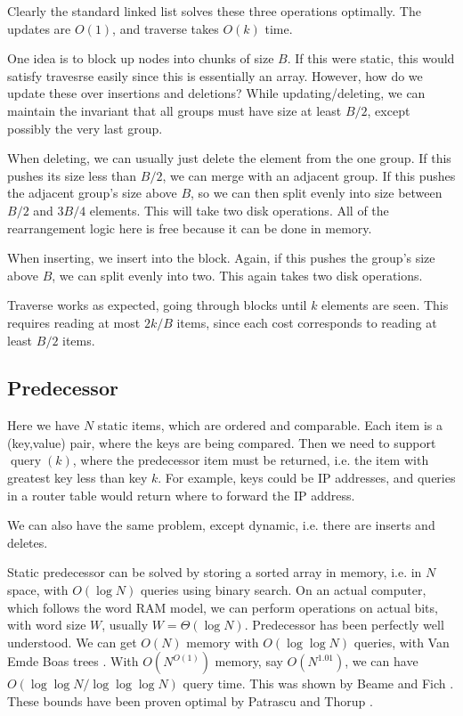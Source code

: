 \documentclass[11pt]{article}
\newcommand{\on}{\operatorname}
\begin{document}
Clearly the standard linked list solves these three operations optimally. The updates are $O(1)$, and traverse takes $O(k)$ time.

One idea is to block up nodes into chunks of size $B$. If this were static, this would satisfy travesrse easily since this is essentially an array. However, how do we update these over insertions and deletions? While updating/deleting, we can maintain the invariant that all groups must have size at least $B / 2$, except possibly the very last group.

When deleting, we can usually just delete the element from the one group. If this pushes its size less than $B / 2$, we can merge with an adjacent group. If this pushes the adjacent group's size above $B$, so we can then split evenly into size between $B / 2$ and $3B / 4$ elements. This will take two disk operations. All of the rearrangement logic here is free because it can be done in memory.

When inserting, we insert into the block. Again, if this pushes the group's size above $B$, we can split evenly into two. This again takes two disk operations.

Traverse works as expected, going through blocks until $k$ elements are seen. This requires reading at most $2k / B$ items, since each cost corresponds to reading at least $B / 2$ items.

\subsection{Predecessor}

Here we have $N$ static items, which are ordered and comparable. Each item is a (key,value) pair, where the keys are being compared. Then we need to support $\on{query}(k)$, where the predecessor item must be returned, i.e. the item with greatest key less than key $k$. For example, keys could be IP addresses, and queries in a router table would return where to forward the IP address.

We can also have the same problem, except dynamic, i.e. there are inserts and deletes.

Static predecessor can be solved by storing a sorted array in memory, i.e. in $N$ space, with $O(\log N)$ queries using binary search. On an actual computer, which follows the word RAM model, we can perform operations on actual bits, with word size $W$, usually $W = \Theta(\log N)$. Predecessor has been perfectly well understood. We can get $O(N)$ memory with $O(\log \log N)$ queries, with Van Emde Boas trees \cite{E75}. With $O(N^{O(1)})$ memory, say $O(N^{1.01})$, we can have $O(\log \log N / \log \log \log N)$ query time. This was shown by Beame and Fich \cite{BF99}. These bounds have been proven optimal by Patrascu and Thorup \cite{PT06}.
\end{document}
